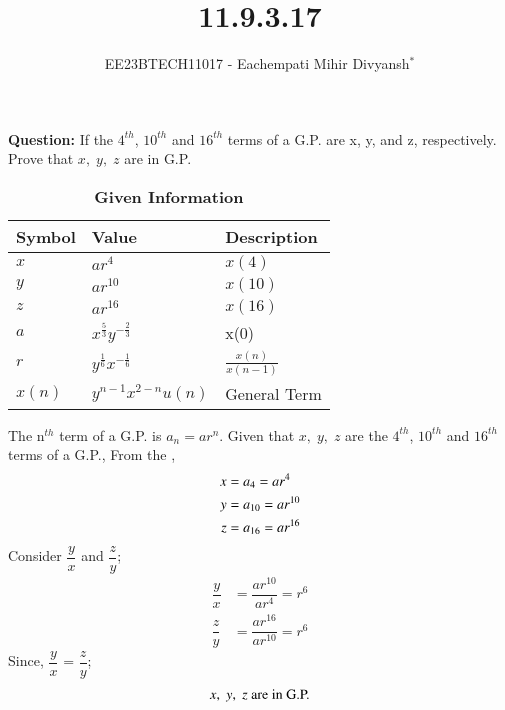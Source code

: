\documentclass[journal,12pt,twocolumn]{IEEEtran}
\theoremstyle{remark}
\begin{document}

\vspace{3cm}

\title{11.9.3.17}
\author{EE23BTECH11017 - Eachempati Mihir Divyansh$^{*}$%
}
\maketitle
\newpage
\bigskip

\renewcommand{\thefigure}{\theenumi}
\renewcommand{\thetable}{\theenumi}

\textbf{Question: }
If the $4^{th}$, $10^{th}$ and $16^{th}$ terms of a G.P. are x, y, and z, respectively. Prove that $x,\; y,\; z$ are in G.P.

\begin{table}[h]
    \renewcommand\thetable{1}
    \centering
        \caption{\textbf{Given Information}}
    \begin{tabular}{|m{2cm}|m{2cm}|m{2cm}|}
    \hline
    \textbf{Symbol} & \textbf{Value} & \textbf{Description}\\ [1ex]
    \hline
        $x$ & $ar^4$ & $x(4)$ \\ [1ex]
    \hline
        $y$ & $ar^{10}$ & $x(10)$\\ [1ex]
    \hline
        $z$ & $ar^{16}$ & $x(16)$\\ [1ex]
    \hline
        $a$ & $x^{\frac{5}{3}}y^{-\frac{2}{3}}$ & x(0) \\[1ex]
    \hline
        $r$ & $y^{\frac{1}{6}}x^{-\frac{1}{6}}$ & $\frac{x(n)}{x(n-1)}$\\[1ex]
    \hline \vspace{0.1cm}
        $x(n)$ & $y^{n-1} x^{2-n} u(n)$ & General Term \\ [1ex]
    \hline
    \end{tabular}
\end{table} \label{table}

\solution


The n$^{th}$ term of a G.P. is $a_n=ar^n$. Given that $x,\; y,\; z$ are the $4^{th}$, $10^{th}$ and $16^{th}$ terms of a G.P., From the ,
\begin{align}
\notag x&= a_4 =ar^4 \\
\notag y&=a_{10}=ar^{10} \\
\notag z&=a_{16}=ar^{16}
\end{align}
Consider $\dfrac{y}{x}$ and $\dfrac{z}{y}$;
\begin{align}
\dfrac{y}{x} &= \dfrac{ar^{10}}{ar^4} = r^6\\
\dfrac{z}{y} &= \dfrac{ar^{16}}{ar^{10}} = r^6
\end{align}
Since, $\dfrac{y}{x}$ = $\dfrac{z}{y}$;\\
\begin{align}  
\notag    x,\; y,\; z \text{ are in G.P.}
\end{align}
\end{document}
